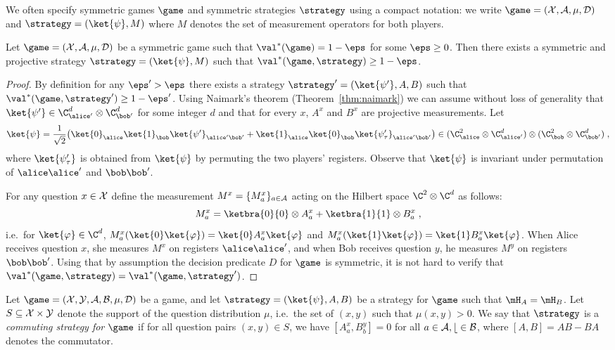 We often specify symmetric games $\game$ and symmetric strategies $\strategy$ using
  a compact notation: we write $\game = (\cal{X}, \cal{A}, \mu, D)$ and
  $\strategy = (\ket{\psi}, M)$ where $M$ denotes the set of measurement
  operators for both players.

\begin{lemma}\label{lem:symmetric-strat}
  Let $\game = (\cal{X}, \cal{A},  \mu, D)$ be a symmetric game
  such that $\val^*(\game) = 1-\eps$ for some $\eps\geq 0$.
  Then there exists a symmetric and projective strategy
  $\strategy=(\ket{\psi},M)$ such that $\val^*(\game,\strategy)\geq 1-\eps$.
\end{lemma}

\begin{proof}
  By definition for any $\eps'>\eps$ there exists a strategy $\strategy'= (\ket{\psi'},A,B)$ such
  that $\val^*(\game,\strategy')\geq 1-\eps'$.
Using Naimark's theorem (Theorem~\ref{thm:naimark}) we can assume
without loss of generality that $\ket{\psi'}\in\C_{\alice'}^d\otimes \C_{\bob'}^d$ for some integer $d$
  and that for every $x$, $A^x$ and $B^x$ are projective measurements.
Let
  \[
    \ket{\psi} = \frac{1}{\sqrt{2}} \big( \ket{0}_\alice \ket{1}_\bob
    \ket{\psi'}_{\alice'\bob'} + \ket{1}_\alice \ket{0}_\bob
    \ket{\psi'_\tau}_{\alice'\bob'}\big) \in (\C_{\alice}^2 \otimes
    \C_{\alice'}^d) \otimes (\C_\bob^2 \otimes \C_{\bob'}^d)\;,
  \]
  where $\ket{\psi'_\tau}$ is obtained from $\ket{\psi}$ by permuting the two
  players' registers.
  Observe that $\ket{\psi}$ is invariant under permutation of $\alice\alice'$
  and $\bob\bob'$.

  For any question $x\in \cal{X}$ define the measurement $M^x = \{M^x_a\}_{a \in \cal{A}}$
  acting on the Hilbert space $\C^2 \otimes \C^d$ as follows:
  \[
  	M^x_a = \ketbra{0}{0} \otimes A^x_a + \ketbra{1}{1} \otimes B^x_a \;,
  \]
	i.e.\ for $\ket{\varphi} \in \C^d$, $M^x_a(\ket{0}\ket{\varphi})=\ket{0}A^x_a\ket{\varphi}$ and $M^x_a(\ket{1}\ket{\varphi})=\ket{1}B^x_a\ket{\varphi}$.
  When Alice receives question $x$, she measures $M^x$ on registers $\alice \alice'$, and when Bob receives 
  question $y$, he measures $M^y$ on registers $\bob \bob'$.
Using that by assumption the decision predicate $D$ for $\game$ is symmetric,
  it is not hard to verify that $\val^*(\game,\strategy) =
  \val^*(\game,\strategy')$.
\end{proof}

\begin{definition}
  \label{def:comm-strategy}
  Let $\game = (\cal{X}, \cal{Y}, \cal{A}, \cal{B}, \mu, D)$ be a game, and let
  $\strategy = (\ket{\psi}, A, B)$ be a strategy for $\game$ such that  $\mH_A = \mH_B$.
  Let $S \subseteq \cal{X} \times \cal{Y}$ denote the support of the question
  distribution $\mu$, i.e.\ the set of $(x,y)$ such that $\mu(x,y)>0$.
  We say that $\strategy$ is a \emph{commuting strategy for $\game$} if for all
  question pairs $(x, y) \in S$, we have $[A^x_a, B^y_b] = 0$ 
  for all $a
  \in \cal{A}, b \in \cal{B}$, where $[A, B] = AB - BA$ denotes the commutator.
\end{definition}

